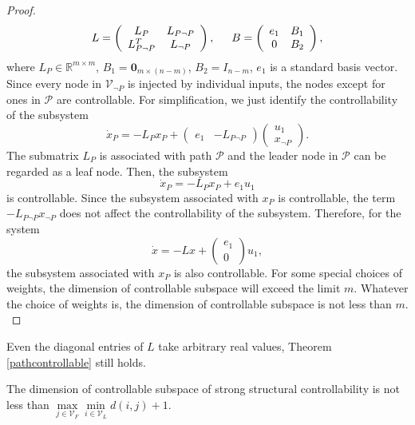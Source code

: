 \documentclass[a4paper,11pt]{article}
\begin{document}
{\begin{proof}
\begin{equation*}
  L=\left(\begin{array}{*{20}{c}}
  L_P&L_{P\neg P}\\
  L_{P\neg P}^T&L_{\neg P}
  \end{array}\right),\hspace{1.5em}
  B=\left(\begin{array}{*{20}{c}}
  e_1&B_1\\
  0&B_2
  \end{array}\right),
\end{equation*}
where $L_P\in\mathbb{R}^{m\times m}$, $B_1=\mathbf{0}_{m\times(n-m)}$, $B_2=I_{n-m}$, $e_1$ is a standard basis vector. Since every node in $\mathcal{V}_{\neg P}$ is injected by individual inputs, the nodes except for ones in $\mathcal{P}$ are controllable. For simplification, we just identify the controllability of the subsystem
\begin{equation*}
  \dot x_{P}=-L_Px_{P}+\left( {\begin{array}{*{20}{c}}
{{e_1}}&{ - L_{P\neg P}}
\end{array}} \right)\left( {\begin{array}{*{20}{c}}
{{u_1}}\\
{{x_{\neg P}}}
\end{array}} \right).
\end{equation*}
The submatrix $L_P$ is associated with path $\mathcal{P}$ and the leader node in $\mathcal{P}$ can be regarded as a leaf node. Then, the subsystem
\begin{equation*}
    \dot x_{P}=-L_Px_{P}+e_1u_1
\end{equation*}
is controllable.  Since the subsystem associated with $x_P$ is controllable, the term $- L_{P\neg P}x_{\neg P}$ does not affect the controllability of the subsystem. Therefore, for the system
\begin{equation*}
  \dot x=-Lx+\left(\begin{array}{*{20}{c}}
  e_1\\
  0
  \end{array}\right)u_1,
\end{equation*}
the subsystem associated with $x_P$ is also controllable. For some special choices of weights, the dimension of controllable subspace will exceed the limit $m.$ Whatever the choice of weights is, the dimension of controllable subspace is not less than $m.$
\end{proof}
\begin{remark}
Even the diagonal entries of $L$ take arbitrary real values, Theorem \ref{pathcontrollable} still holds.
\end{remark}
\begin{corollary}\label{shortest}
The dimension of controllable subspace of strong structural controllability is not less than $\max\limits_{j\in\mathcal{V}_F}\min\limits_{i\in\mathcal{V}_L} d(i,j)+1$.
\end{corollary}

}
\end{document}

